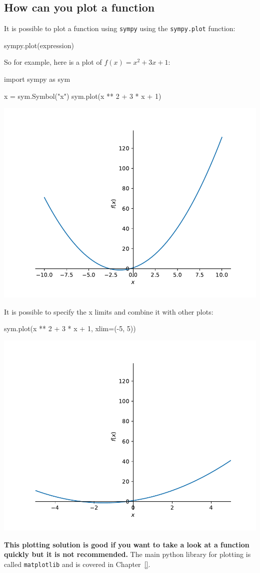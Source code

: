 \subsection{How can you plot a function}
\label{\detokenize{tools-for-mathematics/03-calculus/why/main:how-can-you-plot-a-function}}

It is possible to plot a function using \texttt{sympy} using the \texttt{sympy.plot} function:


\begin{pyin}
sympy.plot(expression)
\end{pyin}



So for example, here is a plot of \(f(x)=x^2 + 3x + 1\):





\begin{pyin}
import sympy as sym

x = sym.Symbol("x")
sym.plot(x ** 2 + 3 * x + 1)
\end{pyin}


\begin{center}
    \includegraphics[width=.7\textwidth]{./assets/plotting_with_sympy/main.pdf}
\end{center}

It is possible to specify the x limits and combine it with other plots:

\begin{pyin}
sym.plot(x ** 2 + 3 * x + 1, xlim=(-5, 5))
\end{pyin}

\begin{center}
    \includegraphics[width=.7\textwidth]{./assets/plotting_with_sympy_with_xlim/main.pdf}
\end{center}




\textbf{This plotting solution is good if you want to take a look at a function
quickly but it is not recommended.} The main python library for plotting is called
\texttt{matplotlib} and is covered in Chapter~\ref{}.
